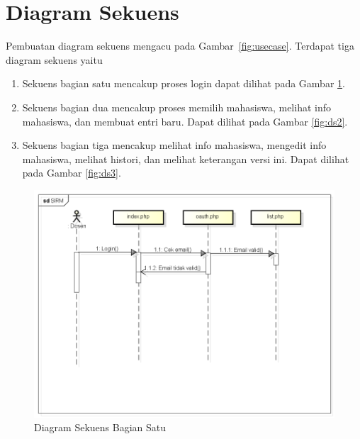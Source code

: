 \section{Diagram Sekuens}
\label{sec:diagramsekuens}

Pembuatan diagram sekuens mengacu pada Gambar~\ref{fig:usecase}. Terdapat
tiga diagram sekuens yaitu 
\begin{enumerate}[1]
  \item Sekuens bagian satu mencakup proses login dapat dilihat pada Gambar
  \ref{fig:ds1}.
  \item Sekuens bagian dua mencakup proses memilih mahasiswa, melihat
  info mahasiswa, dan membuat entri baru. Dapat dilihat pada Gambar \ref{fig:ds2}.
  \item Sekuens bagian tiga mencakup melihat info mahasiswa, mengedit info
  mahasiswa, melihat histori, dan melihat keterangan versi ini.
  Dapat dilihat pada Gambar \ref{fig:ds3}.
\end{enumerate}

\begin{figure}[H]
\centering
\includegraphics[scale=0.5]{Gambar/sekuenslogin.png}
\caption[Diagram Sekuens Bagian Satu]{Diagram Sekuens Bagian Satu} 
\label{fig:ds1}
\end{figure}

